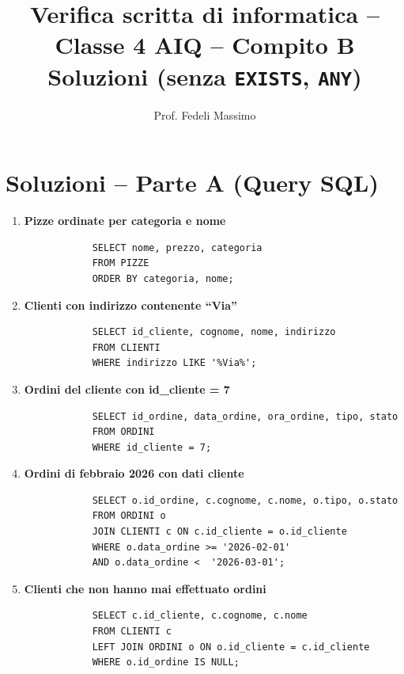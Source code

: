 \documentclass[a4paper,12pt]{article}
\title{Verifica scritta di informatica -- Classe 4 AIQ -- Compito B\\
	Soluzioni (senza \texttt{EXISTS}, \texttt{ANY})}
\author{Prof. Fedeli Massimo}
\date{}
\begin{document}
	\maketitle
	
	\section*{Soluzioni -- Parte A (Query SQL)}
	
	\begin{enumerate}
		
		\item \textbf{Pizze ordinate per categoria e nome}
		\begin{lstlisting}
			SELECT nome, prezzo, categoria
			FROM PIZZE
			ORDER BY categoria, nome;
		\end{lstlisting}
		
		\item \textbf{Clienti con indirizzo contenente ``Via''}
		\begin{lstlisting}
			SELECT id_cliente, cognome, nome, indirizzo
			FROM CLIENTI
			WHERE indirizzo LIKE '%Via%';
		\end{lstlisting}
		
		\item \textbf{Ordini del cliente con id\_cliente = 7}
		\begin{lstlisting}
			SELECT id_ordine, data_ordine, ora_ordine, tipo, stato
			FROM ORDINI
			WHERE id_cliente = 7;
		\end{lstlisting}
		
		\item \textbf{Ordini di febbraio 2026 con dati cliente}
		\begin{lstlisting}
			SELECT o.id_ordine, c.cognome, c.nome, o.tipo, o.stato
			FROM ORDINI o
			JOIN CLIENTI c ON c.id_cliente = o.id_cliente
			WHERE o.data_ordine >= '2026-02-01'
			AND o.data_ordine <  '2026-03-01';
		\end{lstlisting}
		
		\item \textbf{Clienti che non hanno mai effettuato ordini}
		\begin{lstlisting}
			SELECT c.id_cliente, c.cognome, c.nome
			FROM CLIENTI c
			LEFT JOIN ORDINI o ON o.id_cliente = c.id_cliente
			WHERE o.id_ordine IS NULL;
		\end{lstlisting}
		

\end{enumerate}
\end{document}

